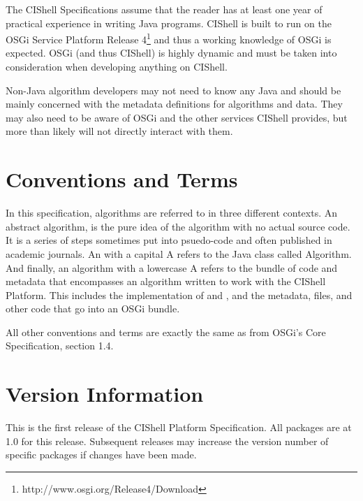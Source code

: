 The CIShell Specifications assume that the reader has at least one year of
practical experience in writing Java programs. CIShell is built to run on the
OSGi Service Platform Release 4\footnote{http://www.osgi.org/Release4/Download}
and thus a working knowledge of OSGi is expected. OSGi (and thus CIShell) is
highly dynamic and must be taken into consideration when developing anything on
CIShell.

Non-Java algorithm developers may not need to know any Java and should be mainly
concerned with the metadata definitions for algorithms and data. They may also
need to be aware of OSGi and the other services CIShell provides, but more than
likely will not directly interact with them.

\section{Conventions and Terms}

In this specification, algorithms are referred to in three different contexts. An
abstract algorithm, is the pure idea of the algorithm with no actual source code.
It is a series of steps sometimes put into psuedo-code and often published in
academic journals. An  with a capital A refers to the Java class
called Algorithm. And finally, an algorithm with a lowercase A refers to the
bundle of code and metadata that encompasses an algorithm written to work with
the CIShell Platform. This includes the implementation of
 and , and the metadata, files, and
other code that go into an OSGi bundle.

All other conventions and terms are exactly the same as from OSGi's Core
Specification, section 1.4.

\section{Version Information}

This is the first release of the CIShell Platform Specification. All packages are
at 1.0 for this release. Subsequent releases may increase the version number of
specific packages if changes have been made.

